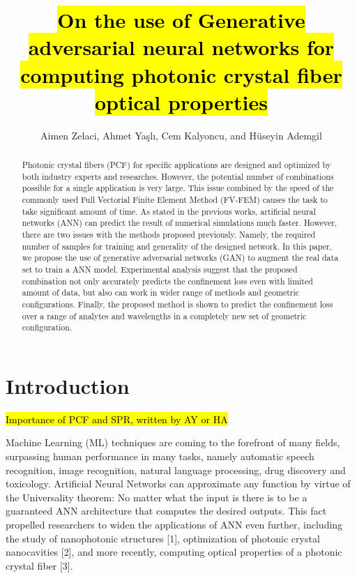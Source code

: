 \documentclass[draft, a4, 10pt, onecolumn]{IEEEtran}
\begin{document}
\title{\hl{On the use of Generative adversarial neural networks for computing photonic crystal fiber optical properties}}

\author{Aimen Zelaci, Ahmet Yaşlı, Cem Kalyoncu, and Hüseyin Ademgil}

\maketitle
	
\begin{abstract}
Photonic crystal fibers (PCF) for specific applications are designed and optimized by both industry experts and researches. However, the potential number of combinations possible for a single application is very large. This issue combined by the speed of the commonly used Full Vectorial Finite Element Method (FV-FEM) causes the task to take significant amount of time. As stated in the previous works, artificial neural networks (ANN) can predict the result of numerical simulations much faster. However, there are two issues with the methods proposed previously. Namely, the required number of samples for training and generality of the designed network. In this paper, we  propose the use of generative adversarial networks (GAN) to augment the real data set to train a ANN model. Experimental analysis suggest that the proposed combination not only accurately predicts the confinement loss even with limited amount of data, but also can work in wider range of methods and geometric configurations. Finally, the proposed method is shown to predict the confinement loss over a range of analytes and wavelengths in a completely new set of geometric configuration.


\end{abstract}

\section{Introduction}

\hl{Importance of PCF and SPR, written by AY or HA}
	
Machine Learning (ML) techniques are coming to the forefront of many fields, surpassing human performance in many tasks, namely automatic speech recognition, image recognition, natural language processing, drug discovery and toxicology. Artificial Neural Networks can approximate any function by virtue of the Universality theorem: No matter what the input is there is to be a guaranteed ANN architecture that computes the desired outputs. This fact propelled researchers to widen the applications of ANN even further, including the study of nanophotonic structures [1], optimization of photonic crystal nanocavities [2], and more recently, computing optical properties of a photonic crystal fiber [3].
\end{document}
